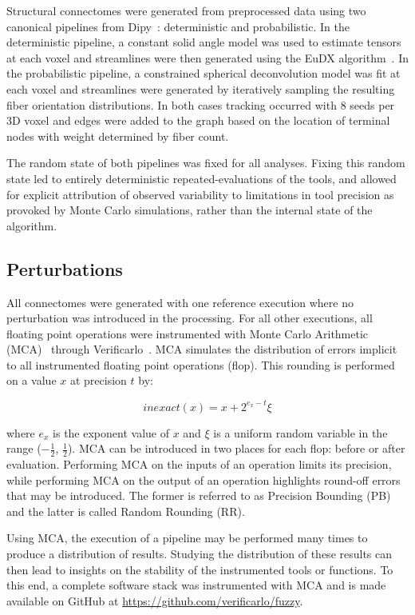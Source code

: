 \documentclass[10pt,letterpaper]{article}
\begin{document}
Structural connectomes were generated from preprocessed data using two canonical
pipelines from Dipy~\cite{Garyfallidis2014-ql}: deterministic and probabilistic. In
the deterministic pipeline, a constant solid angle model was used to estimate
tensors at each voxel and streamlines were then generated using the EuDX
algorithm~\cite{Garyfallidis2012-gg}. In the probabilistic pipeline, a constrained
spherical deconvolution model was fit at each voxel and streamlines were generated
by iteratively sampling the resulting fiber orientation distributions. In both cases
tracking occurred with $8$ seeds per 3D voxel and edges were added to the graph
based on the location of terminal nodes with weight determined by fiber count.

The random state of both pipelines was fixed for all analyses. Fixing this random
state led to entirely deterministic repeated-evaluations of the tools, and allowed
for explicit attribution of observed variability to limitations in tool precision as
provoked by Monte Carlo simulations, rather than the internal state of the algorithm.

\subsection*{Perturbations}
All connectomes were generated with one reference execution where no perturbation was 
introduced in the processing. For all other executions, all floating point operations 
were instrumented with Monte Carlo Arithmetic (MCA)~\cite{Parker1997-qq} through
Verificarlo~\cite{Denis2016-wo}. MCA simulates the distribution of errors implicit to 
all instrumented floating point operations (flop). This rounding is performed on a
value $x$ at precision $t$ by:

\begin{equation}
inexact(x) = x + 2^{e_x - t}\xi 
\label{eq:inexact}
\end{equation}

where $e_x$ is the exponent value of $x$ and $\xi$ is a uniform random variable in
the range ($-\frac{1}{2}$, $\frac{1}{2}$). MCA can be introduced in two places for
each flop: before or after evaluation. Performing MCA on the inputs of an operation
limits its precision, while performing MCA on the output of an operation highlights
round-off errors that may be introduced. The former is referred to as Precision
Bounding (PB) and the latter is called Random Rounding (RR).

Using MCA, the execution of a pipeline may be performed many times to produce a
distribution of results. Studying the distribution of these results can then lead to
insights on the stability of the instrumented tools or functions. To this end, a
complete software stack was instrumented with MCA and is made available on GitHub at
\url{https://github.com/verificarlo/fuzzy}.
\end{document}
